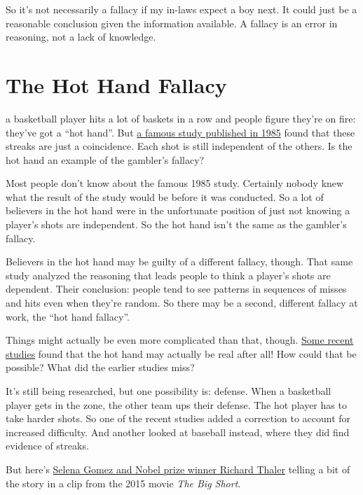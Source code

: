 \documentclass[justified]{tufte-book}
\theoremstyle{definition}
\theoremstyle{definition}
\theoremstyle{definition}
\theoremstyle{remark}
\begin{document}
So it's not necessarily a fallacy if my in-laws expect a boy next. It
could just be a reasonable conclusion given the information available. A
fallacy is an error in reasoning, not a lack of knowledge.

\hypertarget{the-hot-hand-fallacy}{%
\section{The Hot Hand Fallacy}\label{the-hot-hand-fallacy}}

 a basketball player hits a lot of baskets in a
row and people figure they're on fire: they've got a ``hot hand''. But
\href{http://www.sciencedirect.com/science/article/pii/0010028585900106?via\%3Dihub}{a
famous study published in 1985} found that these streaks are just a
coincidence. Each shot is still independent of the others. Is the hot
hand an example of the gambler's fallacy?

Most people don't know about the famous 1985 study. Certainly nobody
knew what the result of the study would be before it was conducted. So a
lot of believers in the hot hand were in the unfortunate position of
just not knowing a player's shots are independent. So the hot hand isn't
the same as the gambler's fallacy.

Believers in the hot hand may be guilty of a different fallacy, though.
That same study analyzed the reasoning that leads people to think a
player's shots are dependent. Their conclusion: people tend to see
patterns in sequences of misses and hits even when they're random. So
there may be a second, different fallacy at work, the ``hot hand
fallacy''.

Things might actually be even more complicated than that, though.
\href{https://www.gsb.stanford.edu/insights/jeffrey-zwiebel-why-hot-hand-may-be-real-after-all}{Some
recent studies} found that the hot hand may actually be real after all!
How could that be possible? What did the earlier studies miss?

It's still being researched, but one possibility is: defense. When a
basketball player gets in the zone, the other team ups their defense.
The hot player has to take harder shots. So one of the recent studies
added a correction to account for increased difficulty. And another
looked at baseball instead, where they did find evidence of streaks.

\begin{marginfigure}
But here's \href{https://www.youtube.com/watch?v=WStmFKp1x3g}{Selena
Gomez and Nobel prize winner Richard Thaler} telling a bit of the story
in a clip from the 2015 movie \emph{The Big Short}.
\end{marginfigure}
\end{document}
